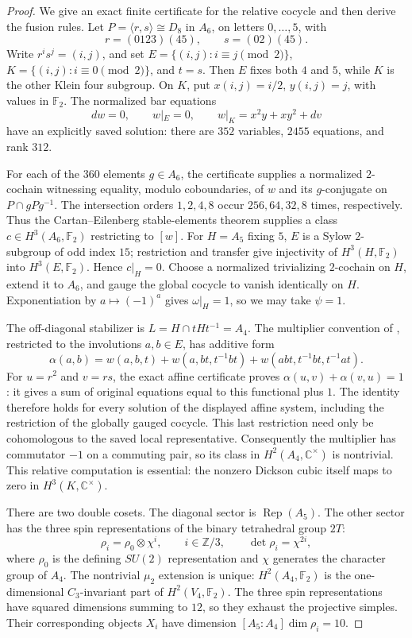 \begin{proof}
We give an exact finite certificate for the relative cocycle and then
derive the fusion rules. Let $P=\langle r,s\rangle\cong D_8$ in $A_6$,
on letters $0,\ldots,5$, with
\[
 r=(0123)(45),\qquad s=(02)(45).
\]
Write $r^is^j=(i,j)$, and set
$E=\{(i,j):i\equiv j\pmod2\}$,
$K=\{(i,j):i\equiv0\pmod2\}$, and $t=s$.
Then $E$ fixes both $4$ and $5$, while $K$ is the other Klein four
subgroup. On $K$, put $x(i,j)=i/2$, $y(i,j)=j$, with values in
$\mathbb F_2$. The normalized bar equations
\[
 dw=0,\qquad w|_E=0,\qquad w|_K=x^2y+xy^2+dv
\]
have an explicitly saved solution: there are $352$ variables,
$2455$ equations, and rank $312$.

For each of the $360$ elements $g\in A_6$, the certificate supplies a
normalized $2$-cochain witnessing equality, modulo coboundaries, of
$w$ and its $g$-conjugate on $P\cap gPg^{-1}$. The intersection orders
$1,2,4,8$ occur $256,64,32,8$ times, respectively. Thus the
Cartan--Eilenberg stable-elements theorem
\cite[Chapter XII, Section 10]{CartanEilenberg} supplies a class
$c\in H^3(A_6,\mathbb F_2)$ restricting to $[w]$.
For $H=A_5$ fixing $5$, $E$ is a Sylow $2$-subgroup of odd index $15$;
restriction and transfer give injectivity of $H^3(H,\mathbb F_2)$
into $H^3(E,\mathbb F_2)$. Hence $c|_H=0$.
Choose a normalized trivializing $2$-cochain on $H$, extend it to
$A_6$, and gauge the global cocycle to vanish identically on $H$.
Exponentiation by $a\mapsto(-1)^a$ gives $\omega|_H=1$, so we may
take $\psi=1$.

The off-diagonal stabilizer is $L=H\cap tHt^{-1}=A_4$.
The multiplier convention of \cite[Section 5.1]{GelakiNaidu}, restricted
to the involutions $a,b\in E$, has additive form
\[
 \alpha(a,b)=w(a,b,t)+w(a,bt,t^{-1}bt)
                   +w(abt,t^{-1}bt,t^{-1}at).
\]
For $u=r^2$ and $v=rs$, the exact affine certificate proves
$\alpha(u,v)+\alpha(v,u)=1$: it gives a sum of original equations
equal to this functional plus $1$. The identity therefore holds for
every solution of the displayed affine system, including the
restriction of the globally gauged cocycle. This last restriction
need only be cohomologous to the saved local representative.
Consequently the multiplier has commutator $-1$ on a commuting pair,
so its class in $H^2(A_4,\mathbb C^\times)$ is nontrivial.
This relative computation is essential: the nonzero Dickson cubic
itself maps to zero in $H^3(K,\mathbb C^\times)$.

There are two double cosets. The diagonal sector is
$\operatorname{Rep}(A_5)$. The other sector has the three spin
representations of the binary tetrahedral group $2T$:
\[
 \rho_i=\rho_0\otimes\chi^i,\qquad i\in\mathbb Z/3,
 \qquad\det\rho_i=\chi^{2i},
\]
where $\rho_0$ is the defining $SU(2)$ representation and $\chi$
generates the character group of $A_4$. The nontrivial $\mu_2$
extension is unique: $H^2(A_4,\mathbb F_2)$ is the one-dimensional
$C_3$-invariant part of $H^2(V_4,\mathbb F_2)$.
The three spin representations have squared dimensions summing to
$12$, so they exhaust the projective simples. Their corresponding
objects $X_i$ have dimension $[A_5:A_4]\dim\rho_i=10$.


\end{proof}
